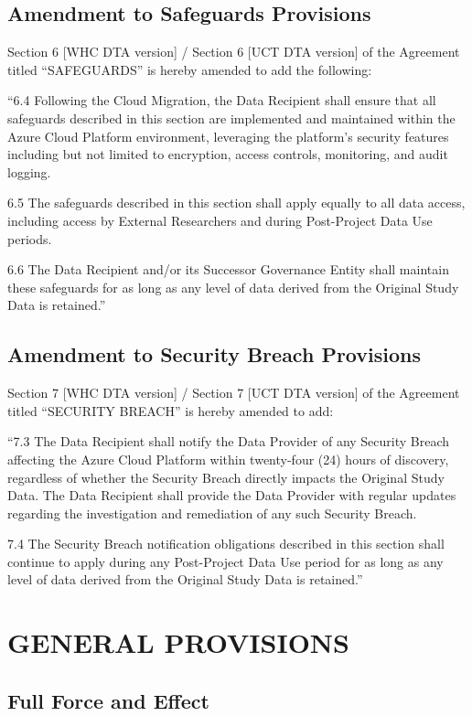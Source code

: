 \documentclass[12pt,letterpaper]{article}
\begin{document}
\subsection{Amendment to Safeguards Provisions}

Section 6 [WHC DTA version] / Section 6 [UCT DTA version] of the Agreement titled ``SAFEGUARDS'' is hereby amended to add the following:

``6.4 Following the Cloud Migration, the Data Recipient shall ensure that all safeguards described in this section are implemented and maintained within the Azure Cloud Platform environment, leveraging the platform's security features including but not limited to encryption, access controls, monitoring, and audit logging.

6.5 The safeguards described in this section shall apply equally to all data access, including access by External Researchers and during Post-Project Data Use periods.

6.6 The Data Recipient and/or its Successor Governance Entity shall maintain these safeguards for as long as any level of data derived from the Original Study Data is retained.''

\subsection{Amendment to Security Breach Provisions}

Section 7 [WHC DTA version] / Section 7 [UCT DTA version] of the Agreement titled ``SECURITY BREACH'' is hereby amended to add:

``7.3 The Data Recipient shall notify the Data Provider of any Security Breach affecting the Azure Cloud Platform within twenty-four (24) hours of discovery, regardless of whether the Security Breach directly impacts the Original Study Data. The Data Recipient shall provide the Data Provider with regular updates regarding the investigation and remediation of any such Security Breach.

7.4 The Security Breach notification obligations described in this section shall continue to apply during any Post-Project Data Use period for as long as any level of data derived from the Original Study Data is retained.''

\section{GENERAL PROVISIONS}

\subsection{Full Force and Effect}
\end{document}
